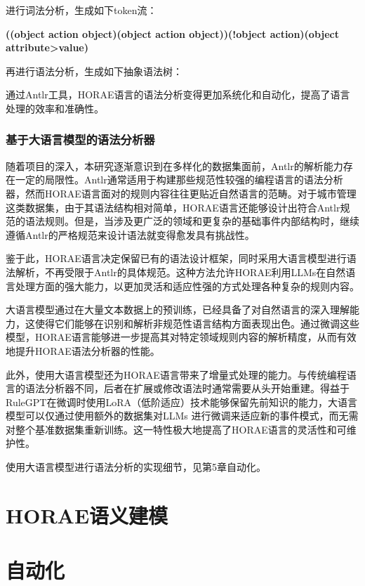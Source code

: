 进行词法分析，生成如下token流：

\textbf{((object action object)(object action object))(!object action)(object attribute>value)}

再进行语法分析，生成如下抽象语法树：

通过Antlr工具，HORAE语言的语法分析变得更加系统化和自动化，提高了语言处理的效率和准确性。

\subsubsection{基于大语言模型的语法分析器}

随着项目的深入，本研究逐渐意识到在多样化的数据集面前，Antlr的解析能力存在一定的局限性。Antlr通常适用于构建那些规范性较强的编程语言的语法分析器，然而HORAE语言面对的规则内容往往更贴近自然语言的范畴。对于城市管理这类数据集，由于其语法结构相对简单，HORAE语言还能够设计出符合Antlr规范的语法规则。但是，当涉及更广泛的领域和更复杂的基础事件内部结构时，继续遵循Antlr的严格规范来设计语法就变得愈发具有挑战性。

鉴于此，HORAE语言决定保留已有的语法设计框架，同时采用大语言模型进行语法解析，不再受限于Antlr的具体规范。这种方法允许HORAE利用LLMs在自然语言处理方面的强大能力，以更加灵活和适应性强的方式处理各种复杂的规则内容。

大语言模型通过在大量文本数据上的预训练，已经具备了对自然语言的深入理解能力，这使得它们能够在识别和解析非规范性语言结构方面表现出色。通过微调这些模型，HORAE语言能够进一步提高其对特定领域规则内容的解析精度，从而有效地提升HORAE语法分析器的性能。

此外，使用大语言模型还为HORAE语言带来了增量式处理的能力。与传统编程语言的语法分析器不同，后者在扩展或修改语法时通常需要从头开始重建。得益于RuleGPT在微调时使用LoRA（低阶适应）技术能够保留先前知识的能力，大语言模型可以仅通过使用额外的数据集对LLMs 进行微调来适应新的事件模式，而无需对整个基准数据集重新训练。这一特性极大地提高了HORAE语言的灵活性和可维护性。

使用大语言模型进行语法分析的实现细节，见第5章自动化。

\cleardoublepage

\section{HORAE语义建模}


\cleardoublepage

\section{自动化}


















